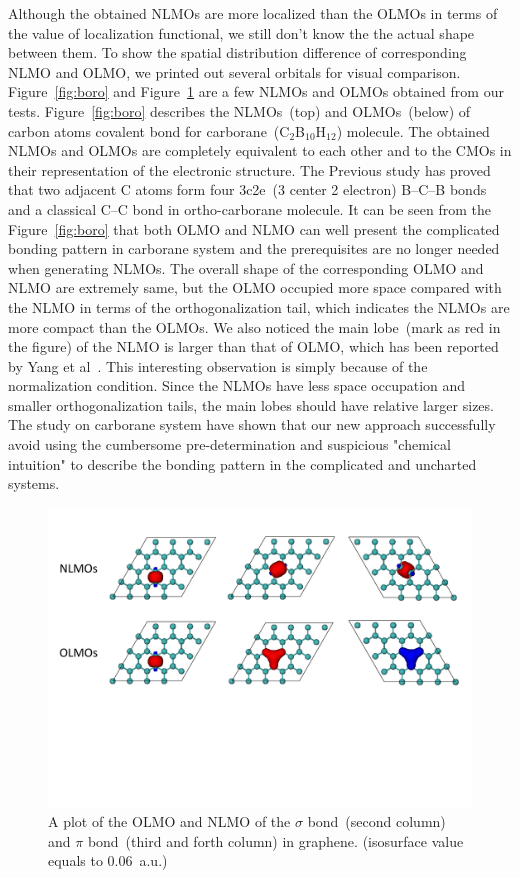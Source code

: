 \documentclass[aps,prl,reprint,amsmath,amssymb]{revtex4-1}
\begin{document}
Although the obtained NLMOs are more localized than the OLMOs in terms of the value of localization functional, we still don't know the the actual shape between them.
To show the spatial distribution difference of corresponding NLMO and OLMO, we printed out several orbitals for visual comparison.
Figure~\ref{fig:boro} and Figure~\ref{fig:graphene} are a few NLMOs and OLMOs obtained from our tests.
Figure~\ref{fig:boro} describes the NLMOs~(top) and OLMOs~(below) of carbon atoms covalent bond for carborane~(C$_2$B$_{10}$H$_{12}$) molecule.
The obtained NLMOs and OLMOs  are completely equivalent to each other and to the CMOs in their representation of the electronic structure.
The Previous study has proved that two adjacent C atoms form four 3c2e~(3 center 2 electron) B–C–B bonds and a classical C–C bond in ortho-carborane molecule\cite{melichar2018systematic}.
It can be seen from the Figure~\ref{fig:boro} that both OLMO and NLMO can well present the complicated bonding pattern in carborane system and the  prerequisites are no longer needed when generating NLMOs.
The overall shape of the corresponding OLMO and NLMO are extremely same, but the OLMO occupied more space compared with the NLMO in terms of the orthogonalization tail, which indicates the NLMOs are more compact than the OLMOs.
We also noticed the main lobe~(mark as red in the figure) of the NLMO is larger than that of OLMO, which has been reported by Yang et al~\cite{liu2000nonorthogonal}.
This interesting observation is simply because of the normalization condition.
Since the NLMOs have less space occupation and smaller orthogonalization tails, the main lobes should have relative larger sizes.
The study on carborane system have shown that our new approach successfully avoid using the cumbersome pre-determination and suspicious "chemical intuition" to describe the bonding pattern in the complicated and uncharted systems.

\begin{figure}[hbpt]
\centering
\includegraphics[width=\textwidth]{figure_4.pdf}
\caption{A plot of the OLMO and NLMO of the $\sigma$ bond~(second column) and $\pi$ bond~(third and forth column) in graphene. (isosurface value equals to  0.06~a.u.)}
\label{fig:graphene}
\end{figure}
\end{document}
